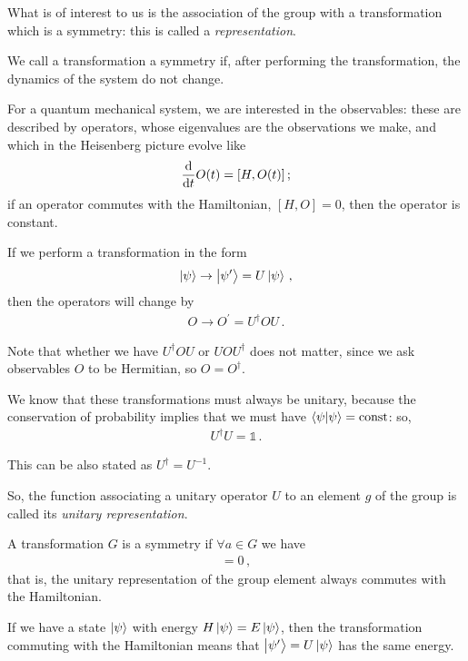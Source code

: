 \documentclass[main.tex]{subfiles}
\begin{document}
What is of interest to us is the association of the group with a transformation which is a symmetry: this is called a \emph{representation}. 

We call a transformation a symmetry if, after performing the transformation, the dynamics of the system do not change. 

For a quantum mechanical system, we are interested in the observables: these are described by operators, whose eigenvalues are the observations we make, and which in the Heisenberg picture evolve like 
%
\begin{align}
\dv{}{t} O(t) = [H, O(t)]
\,;
\end{align}
%
if an operator commutes with the Hamiltonian, \([H,O]=0\), then the operator is constant. 

If we perform a transformation in the form 
%
\begin{align}
\ket{\psi } \rightarrow \ket{\psi'} = U \ket{\psi }
\,,
\end{align}
%
then the operators will change by 
%
\begin{align}
O \rightarrow O^{\prime } = U ^\dag O U 
\,.
\end{align}

Note that whether we have \(U ^\dag O U\) or \(U O U ^\dag\) does not matter, since we ask observables \(O\) to be Hermitian, so \(O = O ^\dag\). 

We know that these transformations must always be unitary, because the conservation of probability implies that we must have \(\braket{\psi }{\psi } = \text{const}\): so, 
%
\begin{align}
U ^\dag U = \mathbb{1}
\,.
\end{align}

This can be also stated as \(U ^\dag = U^{-1}\). 

So, the function associating a unitary operator \(U\) to an element \(g\) of the group is called its \emph{unitary representation}. 

A transformation \(G\) is a symmetry if \(\forall a \in G\) we have 
%
\begin{align}
[U(a), H]  =0
\,,
\end{align}
%
that is, the unitary representation of the group element always commutes with the Hamiltonian.

If we have a state \(\ket{\psi }\) with energy \(H \ket{\psi } = E \ket{\psi }\), then the transformation commuting with the Hamiltonian means that \(\ket{\psi'} = U \ket{\psi }\) has the same energy.
\end{document}
